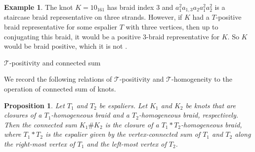 \documentclass{amsart}
\makeatletter
\renewcommand\subsection{\@startsection{subsection}{2}%
  \z@{-.5\linespacing\@plus-.7\linespacing}{.5\linespacing}%
  {\normalfont\scshape}}
\theoremstyle{definition}
\newtheorem{example}[definition]{Example}
\theoremstyle{remark}
\theoremstyle{plain}
\newtheorem{proposition}[definition]{Proposition}
\newcommand{\T}{\mathcal{T}}
\makeatother
\begin{document}
\begin{example}
    The knot $K=10_{161}$ has braid index $3$ and $a_1^2 a_{1,3} a_2 a_1^2 a_2^2$ is a staircase braid representative on three strands. However, if $K$ had a $T$-positive braid representative for some espalier $T$ with three vertices, then up to conjugating this braid, it would be a positive $3$-braid representative for $K$. So $K$ would be braid positive, which it is not \cite{knotinfo}.
\end{example}

\subsection{\texorpdfstring{$\T$-positivity}{T-positivity} and connected sum}

We record the following relations of $\T$-positivity and $\T$-homogeneity to the operation of connected sum of knots.

\begin{proposition}\label{prop:conn_sum}
Let $T_1$ and $T_2$ be espaliers.
Let $K_1$ and $K_2$ be knots that are closures of a $T_1$-homogeneous braid and a $T_2$-homogeneous braid, respectively. Then the connected sum $K_1\# K_2$ is the closure of a $T_1*T_2$-homogeneous braid, where $T_1\ast T_2$ is the espalier given by the vertex-connected sum of $T_1$ and $T_2$ along the right-most vertex of $T_1$ and the left-most vertex of $T_2$.
\end{proposition}
\end{document}
